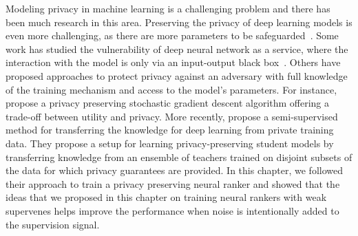 Modeling privacy in machine learning is a challenging problem and there has been much research in this area. Preserving the privacy of deep learning models is even more challenging, as there are more parameters to be safeguarded~\citep{Phan:2016}. 
Some work has studied the vulnerability of deep neural network as a service, where the interaction with the model is only via an input-output black box~\citep{Tramer:2016, Fredrikson:2015, Shokri:2016}.
Others have proposed approaches to protect privacy against an adversary with full knowledge of the training mechanism and access to the model's parameters. For instance, \citet{Abadi:2016} propose a privacy preserving stochastic gradient descent algorithm offering a trade-off between utility and privacy. More recently, \citet{Papernot:2017} propose a semi-supervised method for transferring the knowledge for deep learning from private training data. They propose a setup for learning privacy-preserving student models by transferring knowledge from an ensemble of teachers trained on disjoint subsets of the data for which privacy guarantees are provided. In this chapter, we followed their approach to train a privacy preserving neural ranker and showed that the ideas that we proposed in this chapter on training neural rankers with weak supervenes helps improve the performance when noise is intentionally added to the supervision signal.
